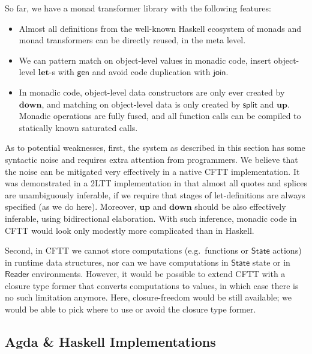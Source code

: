 \documentclass[acmsmall,screen,review,anonymous]{acmart}
\newcommand{\mit}[1]{{\mathsf{#1}}}
\newcommand{\msf}[1]{{\mathsf{#1}}}
\newcommand{\mbf}[1]{{\mathbf{#1}}}
\newcommand{\Reader}{\msf{Reader}}
\theoremstyle{remark}
\newcommand{\mup}{\mbf{up}}
\newcommand{\mdown}{\mbf{down}}
\newcommand{\gen}{\mit{gen}}
\newcommand{\State}{\msf{State}}
\newcommand{\join}{\mit{join}}
\begin{document}
So far, we have a monad transformer library with the following features:
\begin{itemize}
\item Almost all definitions from the well-known Haskell ecosystem of monads and monad transformers
      can be directly reused, in the meta level.
\item We can pattern match on object-level values in monadic code, insert object-level $\mbf{let}$-s
      with $\gen$ and avoid code duplication with $\join$.
\item In monadic code, object-level data constructors are only ever created by
      $\mdown$, and matching on object-level data is only created by $\mit{split}$
      and $\mup$. Monadic operations are fully fused, and all function calls can be
      compiled to statically known saturated calls.
\end{itemize}

As to potential weaknesses, first, the system as described in this section has
some syntactic noise and requires extra attention from programmers.  We believe
that the noise can be mitigated very effectively in a native CFTT
implementation. It was demonstrated in a 2LTT implementation in
\cite{staged-demo} that almost all quotes and splices are unambiguously
inferable, if we require that stages of let-definitions are always specified (as
we do here). Moreover, $\mup$ and $\mdown$ should be also effectively inferable,
using bidirectional elaboration. With such inference, monadic code in CFTT would
look only modestly more complicated than in Haskell.

Second, in CFTT we cannot store computations (e.g.\ functions or $\State$
actions) in runtime data structures, nor can we have computations in $\State$
state or in $\Reader$ environments. However, it would be possible to extend CFTT
with a closure type former that converts computations to values, in which case
there is no such limitation anymore. Here, closure-freedom would be still
available; we would be able to pick where to use or avoid the closure type
former.

\subsection{Agda \& Haskell Implementations}
\end{document}
